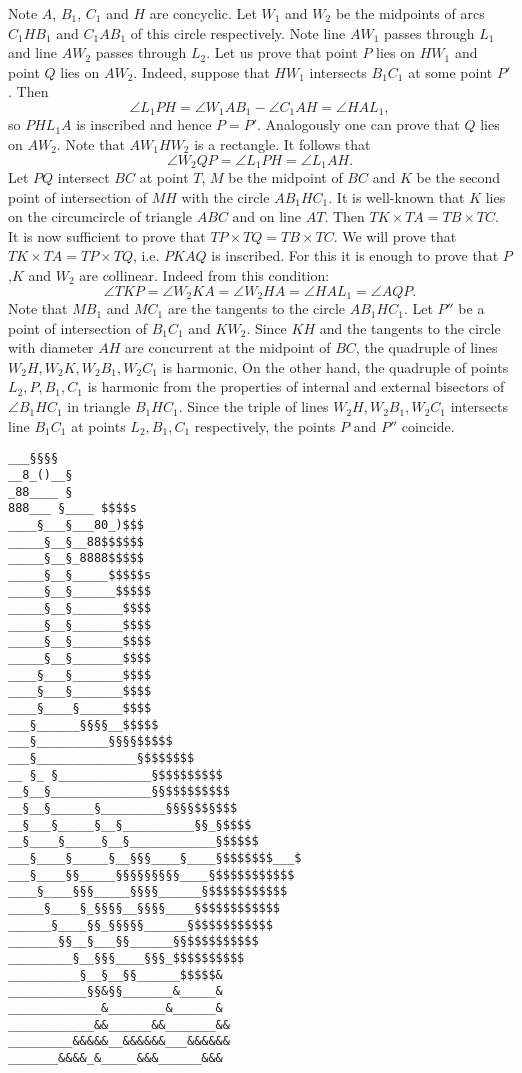 \documentclass{article}
\begin{document}
\begin{enumerate}[1.]
Note $A$, $B_1$, $C_1$ and $H$ are concyclic. Let $W_1$ and $W_2$ be the midpoints of arcs $C_1HB_1$ and $C_1AB_1$ of this circle respectively. Note line $AW_1$ passes through $L_1$ and line $AW_2$ passes through $L_2$. Let us prove that point $P$ lies on $HW_1$ and point $Q$ lies on $AW_2$. Indeed, suppose that $HW_1$ intersects $B_1C_1$ at some point $P'$. Then $$\angle L_1PH = \angle W_1AB_1 - \angle C_1AH = \angle HAL_1,$$ so $PHL_1A$ is inscribed and hence $P = P'$. Analogously one can prove that $Q$ lies on $AW_2$. Note that $AW_1HW_2$ is a rectangle. It follows that $$\angle W_2QP = \angle L_1PH = \angle L_1AH.$$
Let $PQ$ intersect $BC$ at point $T$, $M$ be the midpoint of $BC$ and $K$ be the second point of intersection of $MH$ with the circle $AB_1HC_1$. It is well-known that $K$ lies on the circumcircle of triangle $ABC$ and on line $AT$. Then $TK \times TA = TB \times TC$. It is now sufficient to prove that $TP \times TQ = TB \times TC$. We will prove that $TK \times TA = TP \times TQ$, i.e. $PKAQ$ is inscribed. For this it is enough to prove that $P$,$K$ and $W_2$ are collinear. Indeed from this condition: $$\angle TKP = \angle W_2KA = \angle W_2HA = \angle HAL_1 = \angle AQP.$$
Note that $MB_1$ and $MC_1$ are the tangents to the circle $AB_1HC_1$. Let $P''$ be a point of intersection of $B_1C_1$ and $KW_2$. Since $KH$ and the tangents to the circle with diameter $AH$ are concurrent at the midpoint of $BC$, the quadruple of lines $W_2H, W_2K, W_2B_1, W_2C_1$ is harmonic. On the other hand, the quadruple of points $L_2, P, B_1, C_1$ is harmonic from the properties of internal and external bisectors of $\angle B_1HC_1$ in triangle $B_1HC_1$. Since the triple of lines $W_2H, W_2B_1,W_2C_1$ intersects line $B_1C_1$ at points $L_2, B_1, C_1$ respectively, the points $P$ and $P''$ coincide. 


\end{enumerate}

\vfill
\centering
\tiny
\begin{BVerbatim}
___§§§§
__8_()__§
_88____ §
888___ §____ $$$$s
____§___§___80_)$$$
_____§__§__88$$$$$$
_____§__§_8888$$$$$
_____§__§_____$$$$$s
_____§__§______$$$$$
_____§__§_______$$$$
_____§__§_______$$$$
_____§__§_______$$$$
_____§__§_______$$$$
____§___§_______$$$$
____§___§_______$$$$
____§____§______$$$$
___§______§§§§__$$$$$
___§__________§§§§$$$$$
___§______________§$$$$$$$
__ §_ §_____________§$$$$$$$$$
__§__§______________§§$$$$$$$$$
__§__§______§_________§§§§$$§$$$
__§___§_____§__§__________§§_§$$$$
__§____§_____§__§____________§$$$$$
___§____§_____§__§§§____§____§$$$$$$$___$
___§____§§_____§§§§§§§§§____§$$$$$$$$$$$
____§____§§§_____§§§§______§$$$$$$$$$$$
_____§____§_§§§§__§§§§____§$$$$$$$$$$$
______§____§§_§§§§§______§$$$$$$$$$$$
_______§§__§___§§______§§$$$$$$$$$$
_________§__§§§____§§§_$$$$$$$$$$
__________§__§__§§______$$$$$&
___________§§&§§_______&_____&
_____________&________&______&
____________&&______&&_______&&
_________&&&&&__&&&&&&___&&&&&&
_______&&&&_&_____&&&______&&&
\end{BVerbatim}
\end{document}
